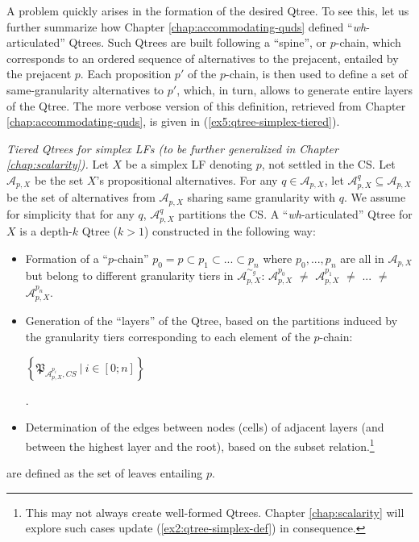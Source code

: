 A problem quickly arises in the formation of the desired Qtree.
To see this, let us further summarize how Chapter \ref{chap:accommodating-quds} defined ``\textit{wh}-articulated'' Qtrees. Such Qtrees are built following a ``spine'', or $p$-chain, which corresponds to an ordered sequence of alternatives to the prejacent, entailed by the prejacent $p$. Each proposition $p'$ of the $p$-chain, is then used to define a set of same-granularity alternatives to $p'$, which, in turn, allows to generate entire layers of the Qtree. The more verbose version of this definition, retrieved from Chapter \ref{chap:accommodating-quds}, is given in (\ref{ex5:qtree-simplex-tiered}).

\begin{exe}
	\ex\label{ex5:qtree-simplex-tiered} {\textit{Tiered Qtrees for simplex LFs (to be further generalized in Chapter \ref{chap:scalarity}). }
		Let $X$ be a simplex LF denoting $p$, not settled in the CS. Let $\mathcal{A}_{p, X}$ be the set $X$'s propositional alternatives. For any $q \in  \mathcal{A}_{p, X}$, let $\mathcal{A}^q_{p, X} \subseteq \mathcal{A}_{p, X}$ be the set of alternatives from $\mathcal{A}_{p, X}$ sharing same granularity with $q$. We assume for simplicity that for any $q$, $\mathcal{A}^q_{p, X}$ partitions the CS. A ``\textit{wh}-articulated'' Qtree for $X$ is a depth-$k$ Qtree ($k > 1$) constructed in the following way:
			\begin{itemize}
				\item Formation of a ``$p$-chain'' $p_0 = p \subset p_1 \subset ... \subset p_n$ where $p_0, ...,  p_n$ are all in $\mathcal{A}_{p, X}$ but belong to different granularity tiers in $\mathcal{A}_{p, X}^{\sim_g}$:  $\mathcal{A}^{p_0}_{p, X}$ $\neq$ $\mathcal{A}^{p_1}_{p, X}$ $\neq$ ... $\neq$$\mathcal{A}^{p_n}_{p, X}$.
				\item Generation of the ``layers'' of the Qtree, based on the partitions induced by the granularity tiers corresponding to each element of the $p$-chain:\\ \begin{small}$\left\lbrace\mathfrak{P}_{\mathcal{A}^{p_i}_{p, X}, CS} \ | \ i \in [0;n]\right\rbrace$\end{small}.
				\item Determination of the edges between nodes (cells) of adjacent layers (and between the highest layer and the root), based on the subset relation.\footnote{This may not always create well-formed Qtrees. Chapter \ref{chap:scalarity} will explore such cases update (\ref{ex2:qtree-simplex-def}) in consequence.}
			\end{itemize}
		 \setlength{\fboxsep}{1pt} are defined as the set of leaves entailing $p$.
	}
\end{exe}

